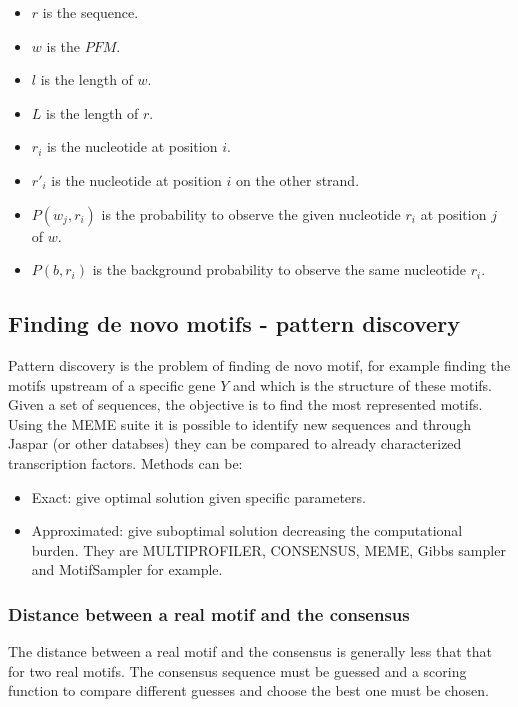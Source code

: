 		\begin{multicols}{2}
			\begin{itemize}
				\item $r$ is the sequence.
				\item $w$ is the $PFM$.
				\item $l$ is the length of $w$.
				\item $L$ is the length of $r$.
				\item $r_i$ is the nucleotide at position $i$.
				\item $r'_i$ is the nucleotide at position $i$ on the other strand.
				\item $P(w_j, r_i)$ is the probability to observe the given nucleotide $r_i$ at position $j$ of $w$.
				\item $P(b, r_i)$ is the background probability to observe the same nucleotide $r_i$.
			\end{itemize}
		\end{multicols}

	\subsection{Finding de novo motifs - pattern discovery}
	Pattern discovery is the problem of finding de novo motif, for example finding the motifs upstream of a specific gene $Y$ and which is the structure of these motifs.
	Given a set of sequences, the objective is to find the most represented motifs.
	Using the MEME suite it is possible to identify new sequences and through Jaspar (or other databses) they can be compared to already characterized transcription factors.
	Methods can be:

	\begin{multicols}{2}
		\begin{itemize}
			\item Exact: give optimal solution given specific parameters.
			\item Approximated: give suboptimal solution decreasing the computational burden.
				They are MULTIPROFILER, CONSENSUS, MEME, Gibbs sampler and MotifSampler for example.
		\end{itemize}
	\end{multicols}

		\subsubsection{Distance between a real motif and the consensus}
		The distance between a real motif and the consensus is generally less that that for two real motifs.
		The consensus sequence must be guessed and a scoring function to compare different guesses and choose the best one must be chosen.

